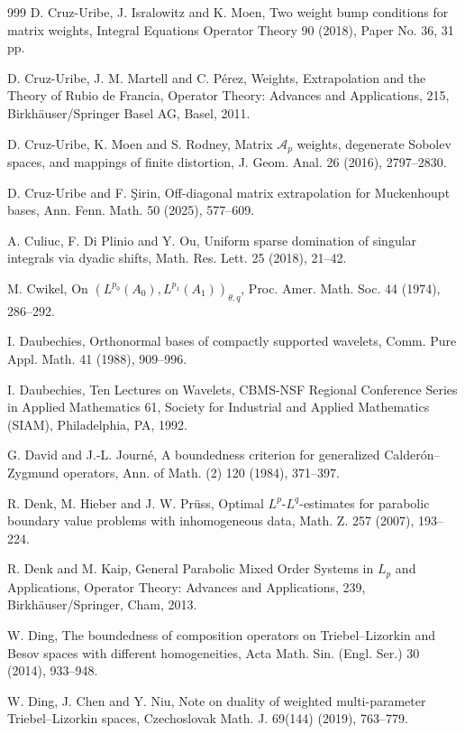 \documentclass[11pt, reqno]{amsart}
\theoremstyle{definition}
\theoremstyle{remark}
\numberwithin{equation}{section}
\begin{document}
\begin{thebibliography}{999}
D. Cruz-Uribe, J. Isralowitz and K. Moen,
Two weight bump conditions for matrix weights,
Integral Equations Operator Theory 90 (2018), Paper No. 36, 31 pp.

D. Cruz-Uribe, J. M. Martell and C. P\'erez,
Weights, Extrapolation and the Theory of Rubio de Francia,
Operator Theory: Advances and Applications, 215,
Birkh\"auser/Springer Basel AG, Basel, 2011.

D. Cruz-Uribe, K. Moen and S. Rodney,
Matrix $\mathcal A_p$ weights, degenerate Sobolev spaces, and mappings of finite distortion,
J. Geom. Anal. 26 (2016), 2797--2830.

D. Cruz-Uribe and F. \c Sirin,
Off-diagonal matrix extrapolation for Muckenhoupt bases,
Ann. Fenn. Math.  50 (2025), 577--609.

A. Culiuc, F. Di Plinio and Y. Ou,
Uniform sparse domination of singular integrals via dyadic shifts,
Math. Res. Lett. 25 (2018), 21--42.

M. Cwikel,
On $(L^{p_0}(A_0), L^{p_1}(A_1))_{\theta,q}$,
Proc. Amer. Math. Soc. 44 (1974), 286--292.

I. Daubechies,
Orthonormal bases of compactly supported wavelets,
Comm. Pure Appl. Math. 41 (1988), 909--996.

I. Daubechies,
Ten Lectures on Wavelets,
CBMS-NSF Regional Conference Series in Applied Mathematics 61,
Society for Industrial and Applied Mathematics (SIAM), Philadelphia, PA, 1992.

G. David and J.-L. Journ\'e,
A boundedness criterion for generalized Calder\'on--Zygmund operators,
Ann. of Math. (2) 120 (1984), 371--397.

R. Denk, M. Hieber and J. W. Pr\"uss,
Optimal $L^p$-$L^q$-estimates for parabolic boundary value problems with inhomogeneous data,
Math. Z. 257 (2007), 193--224.

R. Denk and M. Kaip,
General Parabolic Mixed Order Systems in $L_p$ and Applications,
Operator Theory: Advances and Applications, 239,
Birkh\"auser/Springer, Cham, 2013.

W. Ding,
The boundedness of composition operators on Triebel--Lizorkin
and Besov spaces with different homogeneities,
Acta Math. Sin. (Engl. Ser.) 30 (2014), 933--948.

W. Ding, J. Chen and Y. Niu,
Note on duality of weighted multi-parameter Triebel--Lizorkin spaces,
Czechoslovak Math. J. 69(144) (2019), 763--779.


\end{thebibliography}
\end{document}
